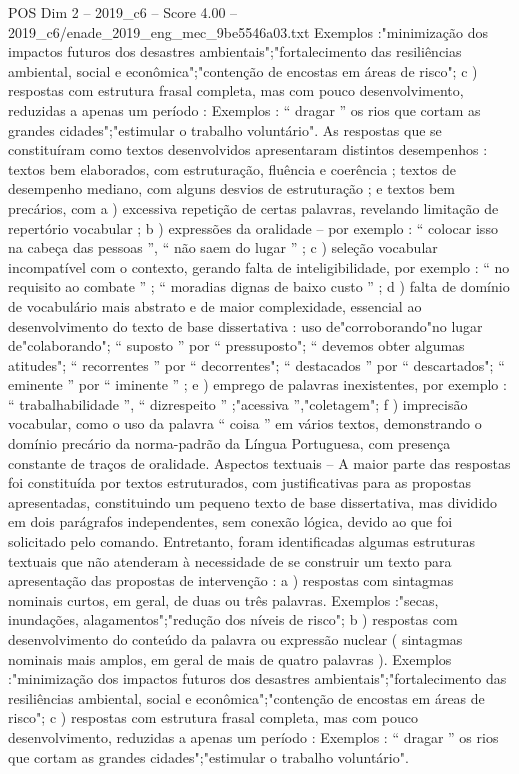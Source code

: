 \begin{textsample}{POS Dim 2 – 2019\_c6 – Score 4.00 – 2019\_c6/enade\_2019\_eng\_mec\_9be5546a03.txt}
Exemplos :"minimização dos impactos futuros dos desastres ambientais";"fortalecimento das resiliências ambiental, social e econômica";"contenção de encostas em áreas de risco"; c ) respostas com estrutura frasal completa, mas com pouco desenvolvimento, reduzidas a apenas um período : Exemplos : “ dragar ” os rios que cortam as grandes cidades";"estimular o trabalho voluntário".
As respostas que se constituíram como textos desenvolvidos apresentaram distintos desempenhos : textos bem elaborados, com estruturação, fluência e coerência ; textos de desempenho mediano, com alguns desvios de estruturação ; e textos bem precários, com a ) excessiva repetição de certas palavras, revelando limitação de repertório vocabular ; b ) expressões da oralidade – por exemplo : “ colocar isso na cabeça das pessoas ”, “ não saem do lugar ” ; c ) seleção vocabular incompatível com o contexto, gerando falta de inteligibilidade, por exemplo : “ no requisito ao combate ” ; “ moradias dignas de baixo custo ” ; d ) falta de domínio de vocabulário mais abstrato e de maior complexidade, essencial ao desenvolvimento do texto de base dissertativa : uso de"corroborando"no lugar de"colaborando"; “ suposto ” por “ pressuposto"; “ devemos obter algumas atitudes"; “ recorrentes ” por “ decorrentes"; “ destacados ” por “ descartados"; “ eminente ” por “ iminente ” ; e ) emprego de palavras inexistentes, por exemplo : “ trabalhabilidade ”, “ dizrespeito ” ;"acessiva ”,"coletagem"; f ) imprecisão vocabular, como o uso da palavra “ coisa ” em vários textos, demonstrando o domínio precário da norma-padrão da Língua Portuguesa, com presença constante de traços de oralidade.
Aspectos textuais – A maior parte das respostas foi constituída por textos estruturados, com justificativas para as propostas apresentadas, constituindo um pequeno texto de base dissertativa, mas dividido em dois parágrafos independentes, sem conexão lógica, devido ao que foi solicitado pelo comando.
Entretanto, foram identificadas algumas estruturas textuais que não atenderam à necessidade de se construir um texto para apresentação das propostas de intervenção : a ) respostas com sintagmas nominais curtos, em geral, de duas ou três palavras.
Exemplos :"secas, inundações, alagamentos";"redução dos níveis de risco"; b ) respostas com desenvolvimento do conteúdo da palavra ou expressão nuclear ( sintagmas nominais mais amplos, em geral de mais de quatro palavras ).
Exemplos :"minimização dos impactos futuros dos desastres ambientais";"fortalecimento das resiliências ambiental, social e econômica";"contenção de encostas em áreas de risco"; c ) respostas com estrutura frasal completa, mas com pouco desenvolvimento, reduzidas a apenas um período : Exemplos : “ dragar ” os rios que cortam as grandes cidades";"estimular o trabalho voluntário".

\end{textsample}
